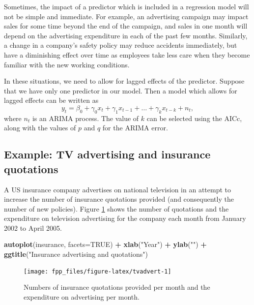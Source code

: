 \documentclass[]{book}
\newenvironment{Shaded}{\begin{snugshade}}{\end{snugshade}}
\newcommand{\DataTypeTok}[1]{\textcolor[rgb]{0.13,0.29,0.53}{#1}}
\newcommand{\KeywordTok}[1]{\textcolor[rgb]{0.13,0.29,0.53}{\textbf{#1}}}
\newcommand{\NormalTok}[1]{#1}
\newcommand{\OperatorTok}[1]{\textcolor[rgb]{0.81,0.36,0.00}{\textbf{#1}}}
\newcommand{\OtherTok}[1]{\textcolor[rgb]{0.56,0.35,0.01}{#1}}
\newcommand{\StringTok}[1]{\textcolor[rgb]{0.31,0.60,0.02}{#1}}
\begin{document}
Sometimes, the impact of a predictor which is included in a regression model will not be simple and immediate. For example, an advertising campaign may impact sales for some time beyond the end of the campaign, and sales in one month will depend on the advertising expenditure in each of the past few months. Similarly, a change in a company's safety policy may reduce accidents immediately, but have a diminishing effect over time as employees take less care when they become familiar with the new working conditions.

In these situations, we need to allow for lagged effects of the predictor. Suppose that we have only one predictor in our model. Then a model which allows for lagged effects can be written as
\[
  y_t = \beta_0 + \gamma_0x_t + \gamma_1 x_{t-1} + \dots + \gamma_k x_{t-k} + n_t,
\]
where \(n_t\) is an ARIMA process. The value of \(k\) can be selected using the AICc, along with the values of \(p\) and \(q\) for the ARIMA error.

\hypertarget{example-tv-advertising-and-insurance-quotations}{%
\subsection*{Example: TV advertising and insurance quotations}\label{example-tv-advertising-and-insurance-quotations}}

A US insurance company advertises on national television in an attempt to increase the number of insurance quotations provided (and consequently the number of new policies). Figure \ref{fig:tvadvert} shows the number of quotations and the expenditure on television advertising for the company each month from January 2002 to April 2005.

\begin{Shaded}
\begin{Highlighting}[]
\KeywordTok{autoplot}\NormalTok{(insurance, }\DataTypeTok{facets=}\OtherTok{TRUE}\NormalTok{) }\OperatorTok{+}
\StringTok{  }\KeywordTok{xlab}\NormalTok{(}\StringTok{"Year"}\NormalTok{) }\OperatorTok{+}\StringTok{ }\KeywordTok{ylab}\NormalTok{(}\StringTok{""}\NormalTok{) }\OperatorTok{+}
\StringTok{  }\KeywordTok{ggtitle}\NormalTok{(}\StringTok{"Insurance advertising and quotations"}\NormalTok{)}
\end{Highlighting}
\end{Shaded}

\begin{figure}

{\centering \texttt{[image: fpp\_files/figure-latex/tvadvert-1]} 

}

\caption{Numbers of insurance quotations provided per month and the expenditure on advertising per month.}\label{fig:tvadvert}
\end{figure}
\end{document}
